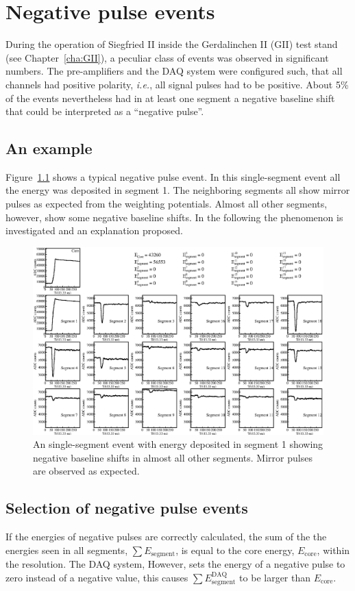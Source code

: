 \chapter{Negative pulse events}
\label{cha:np}
During the operation of Siegfried II inside the Gerdalinchen II (GII)
test stand (see Chapter~\ref{cha:GII}), a peculiar class of events was
observed in significant numbers. The pre-amplifiers and the DAQ system
were configured such, that all channels had positive polarity,
\textit{i.e.}, all signal pulses had to be positive. About 5\% of the
events nevertheless had in at least one segment a negative baseline
shift that could be interpreted as a ``negative pulse''.

\section{An example}
\label{sec:np:evt}
Figure~\ref{fig:np:npul} shows a typical negative pulse event. In this
single-segment event all the energy was deposited in segment 1. The
neighboring segments all show mirror pulses as expected from the
weighting potentials. Almost all other segments, however, show some
negative baseline shifts. In the following the phenomenon is
investigated and an explanation proposed.

\begin{figure}
\centering
\includegraphics{npul}
\caption{An single-segment event with energy deposited in segment 1
showing negative baseline shifts in almost all other segments. Mirror
pulses are observed as expected.}
\label{fig:np:npul}
\end{figure}


\section{Selection of negative pulse events}
\label{sec:np:sel}
If the energies of negative pulses are correctly calculated, the sum
of the the energies seen in all segments, $\sum E_{\text{segment}}$,
is equal to the core energy, $E_{\text{core}}$, within the
resolution. The DAQ system, However, sets the energy of a negative
pulse to zero instead of a negative value, this causes $\sum
E^{\text{DAQ}}_{\text{segment}}$ to be larger than $E_{\text{core}}$.

